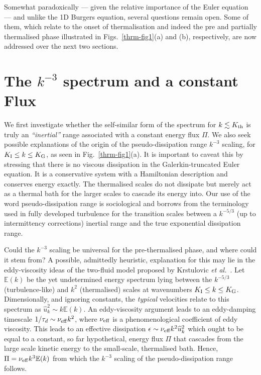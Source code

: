 \documentclass[../Rajarshi-thesis-draft.tex]{subfiles}
\begin{document}
Somewhat paradoxically --- given the relative importance of the Euler equation ---  and unlike the 1D Burgers equation,
several questions remain open. Some of them, which  relate to the onset of thermalisation and indeed the
pre and partially thermalised phase illustrated in Figs.~\ref{thrm-fig1}(a) and (b), respectively,  are now addressed over
the next two sections.

\section{The $k^{-3}$ spectrum and {a constant Flux}}

We first investigate whether the self-similar form of the spectrum for
$k \lesssim K_{\rm th}$ is truly an \textit{``inertial''} range associated
with a constant energy flux $\Pi$. We also seek possible explanations of the origin of
the pseudo-dissipation range $k^{-3}$ scaling, for $K_{\rm I} \le k \le K_{\rm G}$, as seen in Fig.~\ref{thrm-fig1}(a).
It is important to caveat this by stressing that there is no {viscous}
dissipation in the Galerkin-truncated Euler equation. It is a conservative
system with a Hamiltonian description and conserves energy exactly. The thermalised scales do not dissipate but merely act as a thermal bath for the
larger scales to cascade its energy into. Our use of the word pseudo-dissipation
range is sociological and borrows from the terminology used in fully developed
turbulence for the transition scales between a $k^{-5/3}$ (up to intermittency
corrections) inertial range and the true exponential dissipation range.

Could the $k^{-3}$ scaling be universal for the pre-thermalised phase, and where
could it stem from? A possible, admittedly heuristic, explanation for this may
lie in the eddy-viscosity ideas of the two-fluid model proposed by Krstulovic
\textit{et al.}~\cite{Krstulovicetal2009}. Let $\mathbb{E}(k)$ be the yet undetermined
energy spectrum lying between the $k^{-5/3}$ (turbulence-like) and $k^2$
(thermalised) scales at wavenumbers $K_{\rm I} \le k \le K_{\rm G}$.
Dimensionally, and ignoring constants, the \textit{typical} velocities relate
to this spectrum as ${\hat u}^2_k \sim k\mathbb{E}(k)$. An  eddy-viscosity argument
leads to an eddy-damping timescale $1/\tau_d \sim \nu_{\rm eff} k^2$, where
$\nu_{\rm eff}$ is a phenomenological coefficient of eddy viscosity. This leads
to an effective dissipation $\epsilon \sim \nu_{\rm eff} k^2 {\hat u}_k^2$
which ought to be equal to a constant, so far hypothetical,  energy flux $\Pi$
that cascades from the large scale kinetic energy to the small-scale, thermalised
bath. Hence, $\Pi = \nu_{\rm eff} k^3 \mathbb{E}(k)$ from which the $k^{-3}$ scaling of
the pseudo-dissipation range follows.
\end{document}
